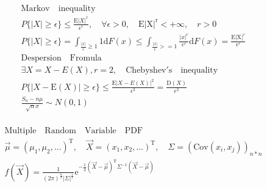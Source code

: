 \documentclass{article}
\begin{document}
\clearpage

\begin{align*}
    \mathrm{Markov \quad inequality}\\
    P\{|X| \ge \epsilon \} \le \frac{\mathrm{E}|X|^{r}}{\epsilon^{r}}, \quad \forall \epsilon > 0, \quad \mathrm{E|X|^{r}} < + \infty, \quad r > 0\\
    P\{|X| \ge \epsilon \} = \int_{\frac{|x|}{\epsilon} \ge 1}^{} 1 \mathrm{d} F(x) \le  \int_{\frac{|x|}{\epsilon} >= 1} \frac{|x|^{r}}{\epsilon ^{r}} \mathrm{d}F(x) = \frac{\mathrm{E|X|}^{r}}{\epsilon^{r}}\\
    \mathrm{Despersion \quad Fromula} \\
    \exists X = X - E(X), r = 2, \quad \mathrm{Chebyshev's \quad inequality}\\
    P\{|X-\mathrm{E}(X)| \ge \epsilon \} \le \frac{\mathrm{E}|X-E(X)|^2}{\epsilon^{2}} = \frac{\mathrm{D}(X)}{\epsilon^{2}}\\
    \frac{S_{n}-n\mu}{\sqrt{n}\sigma} \sim N(0,1)\\
\end{align*}

\clearpage

\begin{align*}
    \mathrm{Multiple \quad Random \quad Variable \quad PDF}\\
    \vec{\mu} = (\mu_{1},\mu_{2},\dots)^{\mathrm{T}}, \quad \vec{X} = (x_{1},x_{2}, \dots)^{\mathrm{T}}, \quad \Sigma = \left(\mathrm{Cov}(x_{i},x_{j})\right)_{n*n}\\
    f(\vec{X}) = \frac{1}{(2\pi)^{\frac{n}{2}}|\Sigma|^{\frac{1}{2}}} \mathrm{e}^{-\frac{1}{2}\left(\vec{X}-\vec{\mu}\right)^{\mathrm{T}} \Sigma^{-1} \left(\vec{X}-\vec{\mu}\right)}\\
\end{align*}
\end{document}
